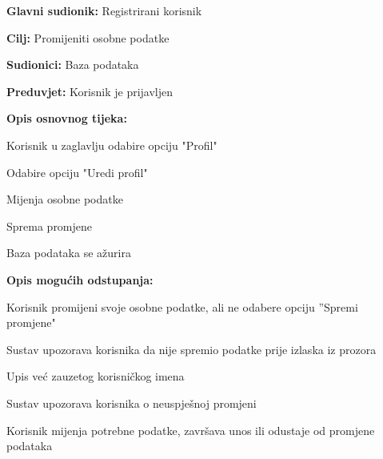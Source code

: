 				\noindent {}
					\begin{packed_item}
	
						\item \textbf{Glavni sudionik: } Registrirani korisnik
						\item \textbf{Cilj:} Promijeniti osobne podatke
						\item \textbf{Sudionici:} Baza podataka
						\item \textbf{Preduvjet:} Korisnik je prijavljen
						\item \textbf{Opis osnovnog tijeka:}
						
						\item[] \begin{packed_enum}
	
							\item Korisnik u zaglavlju odabire opciju "Profil"
							\item Odabire opciju "Uredi profil"
							\item Mijenja osobne podatke
							\item Sprema promjene
							\item Baza podataka se ažurira
							
						\end{packed_enum}
						
						\item  \textbf{Opis mogućih odstupanja:}
						
						\item[] \begin{packed_item}
	
							\item[3.a] Korisnik promijeni svoje osobne podatke, ali ne odabere opciju ”Spremi promjene"
							\item[] \begin{packed_enum}
								
								\item Sustav upozorava korisnika da nije spremio podatke prije izlaska iz prozora
								
							\end{packed_enum}
                            \item[3.b] Upis već zauzetog korisničkog imena
							\item[] \begin{packed_enum}
								
								\item Sustav upozorava korisnika o neuspješnoj promjeni
								\item Korisnik mijenja potrebne podatke, završava unos ili odustaje od promjene podataka
								
							\end{packed_enum}
						\end{packed_item}
					\end{packed_item}
				
